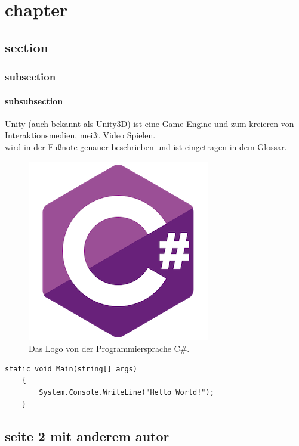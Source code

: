 \chapter{chapter}

\section{section}
\subsection{subsection}
\subsubsection{subsubsection}

Unity (auch bekannt als Unity3D) ist eine Game Engine und  zum kreieren von Interaktionsmedien, meißt Video Spielen. \Cite[][A history of the unity game engine]{haas2014history} \\


 wird in der Fußnote genauer beschrieben und ist eingetragen in dem Glossar.


\begin{figure}[H]
    \centering
    \includegraphics[width=0.2\linewidth]{chapters/00/images/Csharp.png}
    \caption{Das Logo von der Programmiersprache C\#.}
    \label{temp1}
\end{figure}


\begin{lstlisting}[language=CSharp,caption={Hello World},label=code:hello_world]
    static void Main(string[] args)
    {
        System.Console.WriteLine("Hello World!");
    }
\end{lstlisting}  

\pagebreak
\section{seite 2 mit anderem autor}

